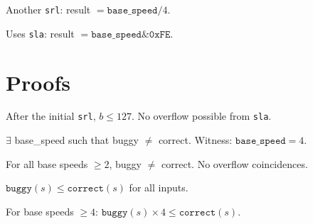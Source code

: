 \begin{definition}\label{def:focus_energy_buggy}
  \leanok
  Another \texttt{srl}: result $= \texttt{base\_speed} / 4$.
\end{definition}

\begin{definition}\label{def:focus_energy_correct}
  \leanok
  Uses \texttt{sla}: result $= \texttt{base\_speed} \mathbin{\&} \mathtt{0xFE}$.
\end{definition}

\section{Proofs}

\begin{lemma}\label{lem:crit_input_bounded}
  \leanok
  After the initial \texttt{srl}, $b \le 127$. No overflow possible from \texttt{sla}.
\end{lemma}

\begin{theorem}\label{thm:focus_energy_bug}
  \leanok
  $\exists$ base\_speed such that buggy $\neq$ correct. Witness: $\texttt{base\_speed} = 4$.
\end{theorem}

\begin{theorem}\label{thm:focus_energy_always_wrong}
  \leanok
  For all base speeds $\ge 2$, buggy $\neq$ correct. No overflow coincidences.
\end{theorem}

\begin{theorem}\label{thm:focus_energy_reduces_rate}
  \leanok
  $\texttt{buggy}(s) \le \texttt{correct}(s)$ for all inputs.
\end{theorem}

\begin{theorem}\label{thm:focus_energy_quarter_rate}
  \leanok
  For base speeds $\ge 4$: $\texttt{buggy}(s) \times 4 \le \texttt{correct}(s)$.
\end{theorem}

